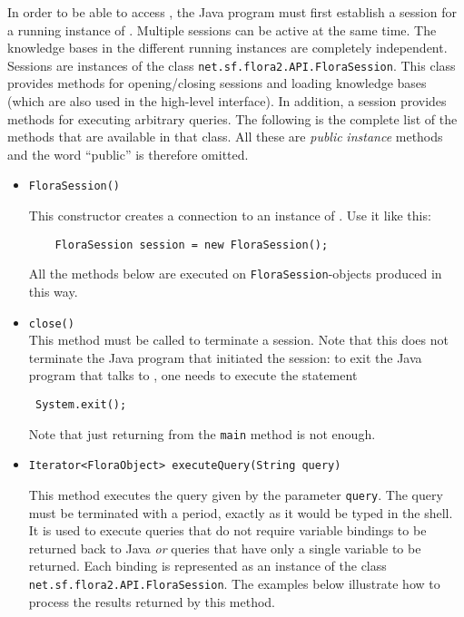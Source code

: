 In order to be able to access \FLSYSTEM, the Java program must first establish
a session for a running instance of \FLSYSTEM. Multiple sessions can be active
at the same time. The knowledge bases in the different running instances
are completely independent. Sessions are instances of
the class {\tt net.sf.flora2.API.FloraSession}. This class provides methods
for opening/closing sessions and loading \FLSYSTEM knowledge bases
(which are also used in the high-level
interface). In addition, a session provides 
methods for executing arbitrary \FLSYSTEM queries. The following is the complete
list of the methods that are available in that class.
All these are \emph{public}
\emph{instance} methods  and the word ``public'' is therefore omitted.
\begin{itemize}
\item
\begin{verbatim}
FloraSession()
\end{verbatim}
  This constructor creates a connection to an instance of \FLSYSTEM.
  Use it like this:
\begin{verbatim}
    FloraSession session = new FloraSession();
\end{verbatim}
  All the methods below are executed on \texttt{FloraSession}-objects
  produced in this way. 
\item {\tt close()} \\
  This method must be called to terminate a \FLSYSTEM session. Note that this does
  not terminate the Java program that initiated the session:
  to exit the Java program that talks to \FLSYSTEM, one needs to execute
  the statement
\begin{verbatim}
 System.exit();  
\end{verbatim}
  Note that just returning from the {\tt main} method is not enough. 

\item
\begin{verbatim}
Iterator<FloraObject> executeQuery(String query)
\end{verbatim}
    This method executes the \FLSYSTEM query given by the
parameter {\tt query}.
The query must be terminated with a period, exactly as it would be typed
in the \FLSYSTEM shell.
It is used to execute \FLSYSTEM queries that
do not require variable bindings to be returned back to Java \emph{or} queries that
have only
a single variable to be returned. Each binding is represented as
an instance of the class {\tt net.sf.flora2.API.FloraSession}.
The examples below illustrate how to process the results returned by this
method.


\end{itemize}
